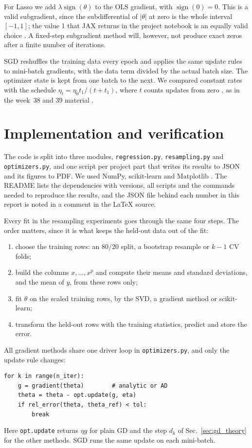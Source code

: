 \documentclass[aps,prb,reprint,superscriptaddress,nofootinbib,longbibliography,floatfix]{revtex4-2}
\begin{document}
For Lasso we add $\lambda\operatorname{sign}(\theta)$ to the OLS gradient, with $\operatorname{sign}(0)=0$. This is a valid subgradient, since the subdifferential of $|\theta|$ at zero is the whole interval $[-1,1]$; the value 1 that JAX returns in the project notebook is an equally valid choice \cite{Project1_2026}. A fixed-step subgradient method will, however, not produce exact zeros after a finite number of iterations.

SGD \cite{Robbins1951} reshuffles the training data every epoch and applies the same update rules to mini-batch gradients, with the data term divided by the actual batch size. The optimizer state is kept from one batch to the next. We compared constant rates with the schedule $\eta_t=\eta_0t_1/(t+t_1)$, where $t$ counts updates from zero \cite[Sec.~4.7]{HjorthJensen2026}, as in the week~38 and 39 material \cite{Exercises38,HjorthJensen2026week39}.

\section{Implementation and verification}\label{sec:implementation}
The code is split into three modules, \texttt{regression.py}, \texttt{resampling.py} and \texttt{optimizers.py}, and one script per project part that writes its results to JSON and its figures to PDF. We used NumPy, scikit-learn and Matplotlib \cite{Harris2020,Pedregosa2011,Hunter2007}. The README lists the dependencies with versions, all scripts and the commands needed to reproduce the results, and the JSON file behind each number in this report is noted in a comment in the LaTeX source.

Every fit in the resampling experiments goes through the same four steps. The order matters, since it is what keeps the held-out data out of the fit:
\begin{enumerate}
\item choose the training rows: an 80/20 split, a bootstrap resample or $k-1$ CV folds;
\item build the columns $x,\dots,x^p$ and compute their means and standard deviations, and the mean of $y$, from these rows only;
\item fit $\theta$ on the scaled training rows, by the SVD, a gradient method or scikit-learn;
\item transform the held-out rows with the training statistics, predict and store the error.
\end{enumerate}
All gradient methods share one driver loop in \texttt{optimizers.py}, and only the update rule changes:
{\small
\begin{verbatim}
for k in range(n_iter):
    g = gradient(theta)        # analytic or AD
    theta = theta - opt.update(g, eta)
    if rel_error(theta, theta_ref) < tol:
        break
\end{verbatim}}
\noindent Here \texttt{opt.update} returns $\eta g$ for plain GD and the step $d_k$ of Sec.~\ref{sec:gd_theory} for the other methods. SGD runs the same update on each mini-batch.
\end{document}
